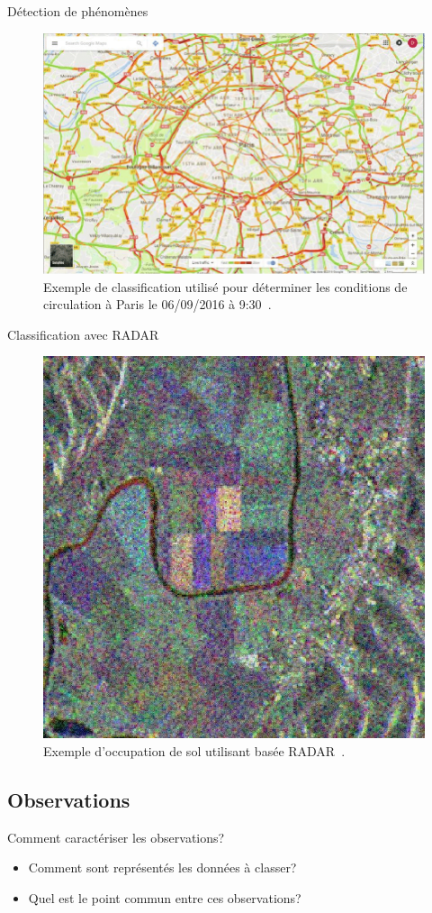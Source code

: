 \documentclass[8pt]{beamer}
\begin{document}
			\begin{frame}{Détection de phénomènes}
				\begin{figure}[H]
					\includegraphics[width=.65\textwidth]{images/samples/traffic_paris}
					\caption*{\tiny Exemple de classification utilisé pour déterminer les conditions de circulation à Paris le 06/09/2016 à 9:30~\cite{tutic2016google}.}
				\end{figure}
			\end{frame}

			\begin{frame}{Classification avec RADAR}
				\begin{figure}[H]
					\includegraphics[width=.45\textwidth]{images/samples/radar}
					\caption*{\tiny Exemple d'occupation de sol utilisant basée RADAR~\cite{EsaRadar}.}
				\end{figure}
			\end{frame}

		\subsection{Observations}
			\begin{frame}{Comment caractériser les observations?}
				\begin{itemize}
					\item<1-> Comment sont représentés les données à classer?
					\item<2-> Quel est le point commun entre ces observations?
				\end{itemize}
			\end{frame}
		
\end{document}
